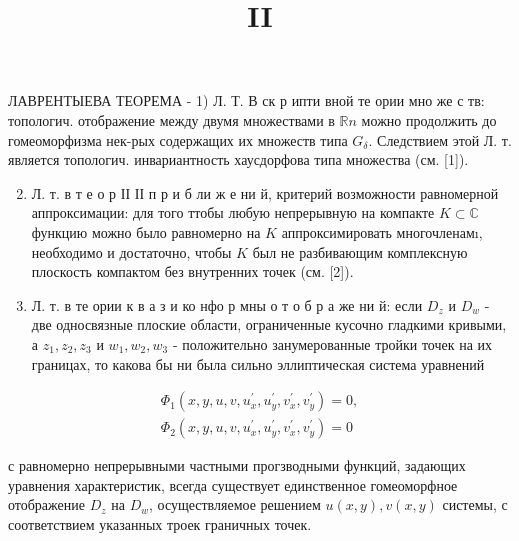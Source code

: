 \documentclass[10pt]{article}
\title{II }
\author{}
\date{}
\begin{document}
\maketitle

ЛАВРЕНТЫЕВА ТЕОРЕМА - 1) Л. Т. В ск р ипти вной те ории мно же с тв: топологич. отображение между двумя множествами в $\mathbb{R} n$ можно продолжить до гомеоморфизма нек-рых содержащих их множеств типа $G_{\delta}$. Следствием этой Л. т. является топологич. инвариантность хаусдорфова типа множества (см. [1]).



\begin{enumerate}

  \setcounter{enumi}{1}

  \item Л. т. в т е о р ІІ ІІ п р и б ли ж е ни й, критерий возможности равномерной аппроксимации: для того ттобы любую непрерывную на компакте $K \subset \mathbb{C}$ функцию можно было равномерно на $K$ аппроксимировать многочленамı, необходимо и достаточно, чтобы $K$ был не разбивающим комплексную плоскость компактом без внутренних точек (см. [2]).



  \item Л. т. в те ории к в а $з$ и ко нфо р мны о т о б р а же ни й: если $D_{z}$ и $D_{w}$ - две односвязные плоские области, ограниченные кусочно гладкими кривыми, а $z_{1}, z_{2}, z_{3}$ и $w_{1}, w_{2}, w_{3}$ - положительно занумерованные тройки точек на их границах, то какова бы ни была сильно эллиптическая система уравнений



\end{enumerate}



\[

\begin{gathered}

\Phi_{1}\left(x, y, u, v, u_{x}^{\prime}, u_{y}^{\prime}, v_{x}^{\prime}, v_{y}^{\prime}\right)=0, \\

\Phi_{2}\left(x, y, u, v, u_{x}^{\prime}, u_{y}^{\prime}, v_{x}^{\prime}, v_{y}^{\prime}\right)=0

\end{gathered}

\]



с равномерно непрерывными частными прогзводными функций, задающих уравнения характеристик, всегда существует единственное гомеоморфное отображение $D_{z}$ на $D_{w}$, осуществляемое решением $u(x, y), v(x, y)$ системы, с соответствием указанных троек граничных точек.
\end{document}
